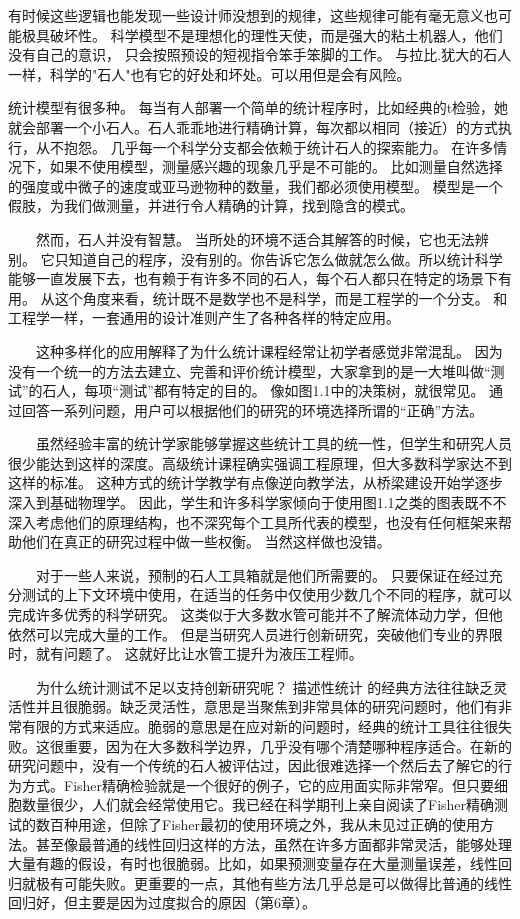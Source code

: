 有时候这些逻辑也能发现一些设计师没想到的规律，这些规律可能有毫无意义也可能极具破坏性。
科学模型不是理想化的理性天使，而是强大的粘土机器人，他们没有自己的意识，
只会按照预设的短视指令笨手笨脚的工作。 
与拉比.犹大的石人一样，科学的"石人"也有它的好处和坏处。可以用但是会有风险。

统计模型有很多种。 每当有人部署一个简单的统计程序时，比如经典的t检验，她就会部署一个小石人。石人乖乖地进行精确计算，每次都以相同（接近）的方式执行，从不抱怨。 几乎每一个科学分支都会依赖于统计石人的探索能力。 在许多情况下，如果不使用模型，测量感兴趣的现象几乎是不可能的。 比如测量自然选择的强度或中微子的速度或亚马逊物种的数量，我们都必须使用模型。 模型是一个假肢，为我们做测量，并进行令人精确的计算，找到隐含的模式。

  然而，石人并没有智慧。 当所处的环境不适合其解答的时候，它也无法辨别。 它只知道自己的程序，没有别的。你告诉它怎么做就怎么做。所以统计科学能够一直发展下去，也有赖于有许多不同的石人，每个石人都只在特定的场景下有用。 从这个角度来看，统计既不是数学也不是科学，而是工程学的一个分支。 和工程学一样，一套通用的设计准则产生了各种各样的特定应用。

  这种多样化的应用解释了为什么统计课程经常让初学者感觉非常混乱。 因为没有一个统一的方法去建立、完善和评价统计模型，大家拿到的是一大堆叫做“测试”的石人，每项“测试”都有特定的目的。 像如图1.1中的决策树，就很常见。 通过回答一系列问题，用户可以根据他们的研究的环境选择所谓的“正确”方法。

  虽然经验丰富的统计学家能够掌握这些统计工具的统一性，但学生和研究人员很少能达到这样的深度。高级统计课程确实强调工程原理，但大多数科学家达不到这样的标准。 这种方式的统计学教学有点像逆向教学法，从桥梁建设开始学逐步深入到基础物理学。 因此，学生和许多科学家倾向于使用图1.1之类的图表既不不深入考虑他们的原理结构，也不深究每个工具所代表的模型，也没有任何框架来帮助他们在真正的研究过程中做一些权衡。 当然这样做也没错。

  对于一些人来说，预制的石人工具箱就是他们所需要的。 只要保证在经过充分测试的上下文环境中使用，在适当的任务中仅使用少数几个不同的程序，就可以完成许多优秀的科学研究。 这类似于大多数水管可能并不了解流体动力学，但他依然可以完成大量的工作。 但是当研究人员进行创新研究，突破他们专业的界限时，就有问题了。 这就好比让水管工提升为液压工程师。

  为什么统计测试不足以支持创新研究呢？ 描述性统计 的经典方法往往缺乏灵活性并且很脆弱。缺乏灵活性，意思是当聚焦到非常具体的研究问题时，他们有非常有限的方式来适应。脆弱的意思是在应对新的问题时，经典的统计工具往往很失败。这很重要，因为在大多数科学边界，几乎没有哪个清楚哪种程序适合。在新的研究问题中，没有一个传统的石人被评估过，因此很难选择一个然后去了解它的行为方式。Fisher精确检验就是一个很好的例子，它的应用面实际非常窄。但只要细胞数量很少，人们就会经常使用它。我已经在科学期刊上亲自阅读了Fisher精确测试的数百种用途，但除了Fisher最初的使用环境之外，我从未见过正确的使用方法。甚至像最普通的线性回归这样的方法，虽然在许多方面都非常灵活，能够处理大量有趣的假设，有时也很脆弱。比如，如果预测变量存在大量测量误差，线性回归就极有可能失败。更重要的一点，其他有些方法几乎总是可以做得比普通的线性回归好，但主要是因为过度拟合的原因（第6章）。

